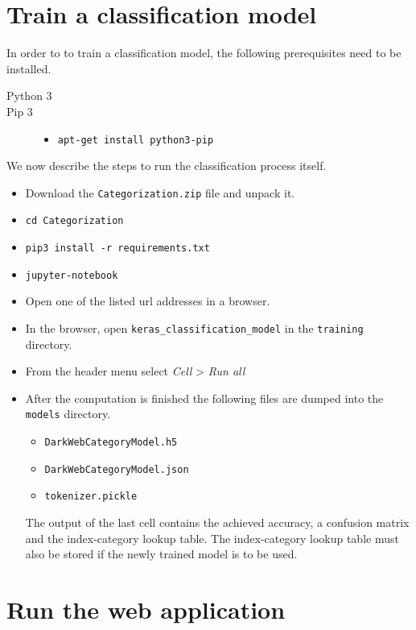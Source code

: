 \begin{appendices}
\chapter{Train a classification model}
In order to to train a classification model, the following prerequisites need to be installed.
\begin{description}
    \item[Python 3] \hfill
    \item[Pip 3] \hfill 
        \begin{itemize}
            \item \texttt{apt-get install python3-pip}
        \end{itemize}
\end{description}
We now describe the steps to run the classification process itself.
\begin{itemize}
    \item Download the \texttt{Categorization.zip} file and unpack it.
    \item \texttt{cd Categorization}
    \item \texttt{pip3 install -r requirements.txt}
    \item \texttt{jupyter-notebook}
    \item Open one of the listed url addresses in a browser.
    \item In the browser, open \texttt{keras\_classification\_model} in the \texttt{training} directory.
    \item From the header menu select \textit{Cell} > \textit{Run all}
    \item After the computation is finished the following files are dumped into the \texttt{models} directory.
        \begin{itemize}
            \item \texttt{DarkWebCategoryModel.h5}
            \item \texttt{DarkWebCategoryModel.json}
            \item \texttt{tokenizer.pickle}
        \end{itemize}
The output of the last cell contains the achieved accuracy,  a confusion matrix and the index-category lookup table. The index-category lookup table must also be stored if the newly trained model is to be used.
\end{itemize}



\chapter{Run the web application}

\end{appendices}
